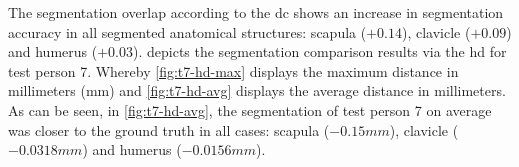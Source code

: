 The segmentation overlap according to the \acrshort{dc} shows an increase in segmentation accuracy in all segmented anatomical structures: scapula ($+0.14$), clavicle ($+0.09$) and humerus ($+0.03$).
 depicts the segmentation comparison results via the \acrfull{hd} for test person 7.
Whereby \cref{fig:t7-hd-max} displays the maximum distance in millimeters (mm) and \cref{fig:t7-hd-avg} displays the average distance in millimeters.
As can be seen, in \cref{fig:t7-hd-avg}, the segmentation of test person 7 on average was closer to the ground truth in all cases: scapula ($-0.15 mm$), clavicle ($-0.0318 mm$) and humerus ($-0.0156 mm$).










